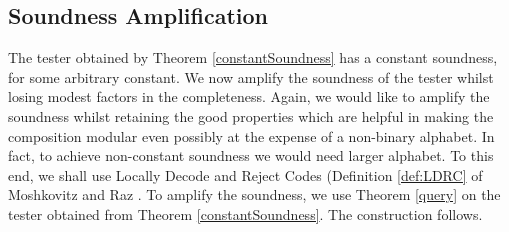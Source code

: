 \subsection{Soundness Amplification}

The tester obtained by Theorem \ref{constantSoundness} has a constant
soundness, for some arbitrary constant. We now amplify the soundness
of the tester whilst losing modest factors in the completeness.
Again, we would like to amplify the soundness whilst retaining the
good properties which are helpful in making the composition modular
even possibly at the expense of a non-binary alphabet. In fact, to
achieve non-constant soundness we would need larger alphabet. To this
end, we shall use Locally Decode and Reject Codes (Definition \ref{def:LDRC} of Moshkovitz and
Raz \cite{MR08}. To amplify the soundness, we use Theorem \ref{query}
on the tester obtained from Theorem \ref{constantSoundness}. The
construction follows.


